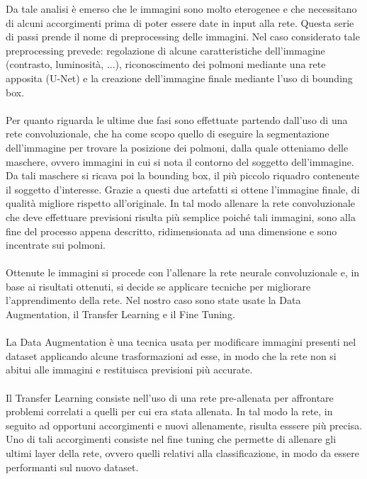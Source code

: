 Da tale analisi è emerso che le immagini sono molto eterogenee e che necessitano di alcuni accorgimenti prima di poter essere 
date in input alla rete. Questa serie di passi prende il nome di preprocessing delle immagini.
Nel caso considerato tale preprocessing prevede: regolazione di alcune caratteristiche dell'immagine (contrasto, luminosità, ...),
riconoscimento dei polmoni mediante una rete apposita (U-Net) e la creazione dell'immagine finale mediante l'uso di bounding box.
\\\\
Per quanto riguarda le ultime due fasi sono effettuate partendo dall'uso di una rete convoluzionale, che ha come scopo 
quello di eseguire la segmentazione dell'immagine per trovare la posizione dei polmoni, dalla quale otteniamo delle maschere, ovvero 
immagini in cui si nota il contorno del soggetto dell'immagine. Da tali maschere si ricava poi la bounding box, il più piccolo
riquadro contenente il soggetto d'interesse.
Grazie a questi due artefatti si ottene l'immagine finale, di qualità migliore rispetto all'originale.
In tal modo allenare la rete convoluzionale che deve effettuare previsioni risulta più semplice poiché tali immagini, sono alla fine del
processo appena descritto, ridimensionata ad una dimensione e sono incentrate sui polmoni. 
\\\\
Ottenute le immagini si procede con l'allenare la rete neurale convoluzionale e, in base ai risultati ottenuti, si decide se applicare 
tecniche per migliorare l'apprendimento della rete. Nel nostro caso sono state usate la Data Augmentation, il Transfer Learning e il Fine Tuning.
\\\\
La Data Augmentation è una tecnica usata per modificare immagini presenti nel dataset applicando alcune trasformazioni ad esse, in modo 
che la rete non si abitui alle immagini e restituisca previsioni più accurate.
\\\\
Il Transfer Learning consiste nell'uso di una rete pre-allenata per affrontare problemi correlati a quelli per cui era stata allenata.
In tal modo la rete, in seguito ad opportuni accorgimenti e nuovi allenamente, risulta esssere più precisa.
Uno di tali accorgimenti consiste nel fine tuning che permette di allenare gli ultimi layer della rete, ovvero quelli relativi alla classificazione,
in modo da essere performanti sul nuovo dataset.
\\\\
